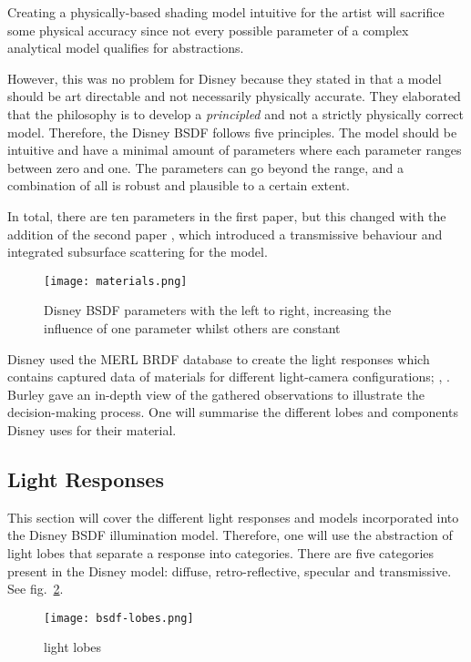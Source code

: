 Creating a physically-based shading model intuitive for the artist will sacrifice some physical accuracy since not every possible parameter of a complex analytical model qualifies for abstractions.

However, this was no problem for Disney because they stated in \cite{burley_physically_2012} that a model should be art directable and not necessarily physically accurate.
They elaborated that the philosophy is to develop a \textit{principled} and not a strictly physically correct model.
Therefore, the Disney BSDF follows five principles.
The model should be intuitive and have a minimal amount of parameters where each parameter ranges between zero and one.
The parameters can go beyond the range, and a combination of all is robust and plausible to a certain extent.

In total, there are ten parameters in the first paper, but this changed with the addition of the second paper \cite{burley_extending_2015}, which introduced a transmissive behaviour and integrated subsurface scattering for the model.

\begin{figure}[h]
\centering
\texttt{[image: materials.png]}
\caption[]{Disney BSDF parameters with the left to right, increasing the influence of one parameter whilst others are constant}
\label{fig:materials}
\end{figure}

Disney used the MERL BRDF database to create the light responses which contains captured data of materials for different light-camera configurations; \cite{matusik_data-driven_2003}, \cite{burley_physically_2012}.
Burley gave an in-depth view of the gathered observations to illustrate the decision-making process.
One will summarise the different lobes and components Disney uses for their material.

\subsection{Light Responses}

This section will cover the different light responses and models incorporated into the Disney BSDF illumination model.
Therefore, one will use the abstraction of light lobes that separate a response into categories.
There are five categories present in the Disney model: diffuse, retro-reflective, specular and transmissive.
See fig.~\ref{fig:lobes}.

\begin{figure}[h]
\centering
\texttt{[image: bsdf-lobes.png]}
\caption[]{light lobes}
\label{fig:lobes}
\end{figure}

